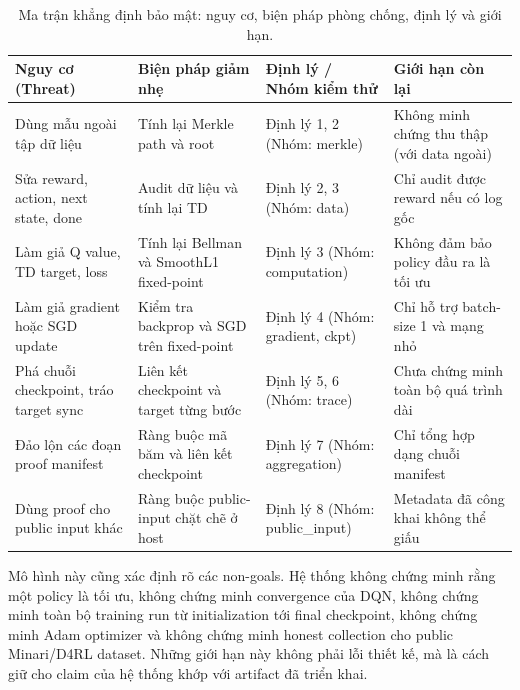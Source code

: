 \documentclass[12pt,a4paper,oneside]{report}
\begin{document}
\begin{table}[H]
\centering
\small
\caption{Ma trận khẳng định bảo mật: nguy cơ, biện pháp phòng chống, định lý và giới hạn.}
\begin{tabularx}{\textwidth}{p{} p{} p{} p{}}
\toprule
\textbf{Nguy cơ (Threat)} & \textbf{Biện pháp giảm nhẹ} & \textbf{Định lý / Nhóm kiểm thử} & \textbf{Giới hạn còn lại} \\
\midrule
Dùng mẫu ngoài tập dữ liệu & Tính lại Merkle path và root & Định lý 1, 2 \newline (Nhóm: merkle) & Không minh chứng thu thập (với data ngoài) \\
\midrule
Sửa reward, action, next state, done & Audit dữ liệu và tính lại TD & Định lý 2, 3 \newline (Nhóm: data) & Chỉ audit được reward nếu có log gốc \\
\midrule
Làm giả Q value, TD target, loss & Tính lại Bellman và SmoothL1 fixed-point & Định lý 3 \newline (Nhóm: computation) & Không đảm bảo policy đầu ra là tối ưu \\
\midrule
Làm giả gradient hoặc SGD update & Kiểm tra backprop và SGD trên fixed-point & Định lý 4 \newline (Nhóm: gradient, ckpt) & Chỉ hỗ trợ batch-size 1 và mạng nhỏ \\
\midrule
Phá chuỗi checkpoint, tráo target sync & Liên kết checkpoint và target từng bước & Định lý 5, 6 \newline (Nhóm: trace) & Chưa chứng minh toàn bộ quá trình dài \\
\midrule
Đảo lộn các đoạn proof manifest & Ràng buộc mã băm và liên kết checkpoint & Định lý 7 \newline (Nhóm: aggregation) & Chỉ tổng hợp dạng chuỗi manifest \\
\midrule
Dùng proof cho public input khác & Ràng buộc public-input chặt chẽ ở host & Định lý 8 \newline (Nhóm: public\_input) & Metadata đã công khai không thể giấu \\
\bottomrule
\end{tabularx}
\end{table}

Mô hình này cũng xác định rõ các non-goals. Hệ thống không chứng minh rằng một policy là tối ưu, không chứng minh convergence của DQN, không chứng minh toàn bộ training run từ initialization tới final checkpoint, không chứng minh Adam optimizer và không chứng minh honest collection cho public Minari/D4RL dataset. Những giới hạn này không phải lỗi thiết kế, mà là cách giữ cho claim của hệ thống khớp với artifact đã triển khai.
\end{document}
